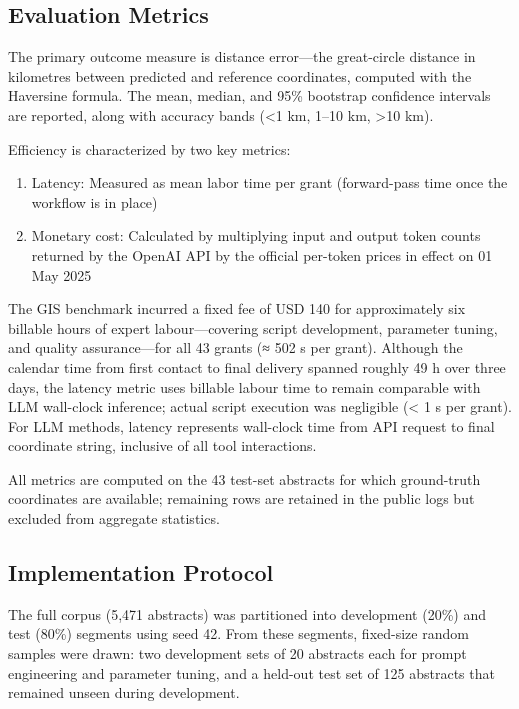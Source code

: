 \subsection{Evaluation Metrics}\label{evaluation-metrics}

The primary outcome measure is distance error---the great-circle
distance in kilometres between predicted and reference coordinates,
computed with the Haversine formula. The mean, median, and 95\%
bootstrap confidence intervals are reported, along with accuracy bands
(\textless1 km, 1--10 km, \textgreater10 km).

Efficiency is characterized by two key metrics:

\begin{enumerate}
\def\labelenumi{\arabic{enumi}.}
\tightlist
\item
  Latency: Measured as mean labor time per grant (forward-pass time once
  the workflow is in place)
\item
  Monetary cost: Calculated by multiplying input and output token counts
  returned by the OpenAI API by the official per-token prices in effect
  on 01 May 2025
\end{enumerate}

The GIS benchmark incurred a fixed fee of USD 140 for approximately six
billable hours of expert labour---covering script development, parameter
tuning, and quality assurance---for all 43 grants (≈ 502 s per grant).
Although the calendar time from first contact to final delivery spanned
roughly 49 h over three days, the latency metric uses billable labour
time to remain comparable with LLM wall-clock inference; actual script
execution was negligible (\textless{} 1 s per grant). For LLM methods,
latency represents wall-clock time from API request to final coordinate
string, inclusive of all tool interactions.

All metrics are computed on the 43 test-set abstracts for which
ground-truth coordinates are available; remaining rows are retained in
the public logs but excluded from aggregate statistics.

\subsection{Implementation Protocol}\label{implementation-protocol}

The full corpus (5,471 abstracts) was partitioned into development
(20\%) and test (80\%) segments using seed 42. From these segments,
fixed-size random samples were drawn: two development sets of 20
abstracts each for prompt engineering and parameter tuning, and a
held-out test set of 125 abstracts that remained unseen during
development.

